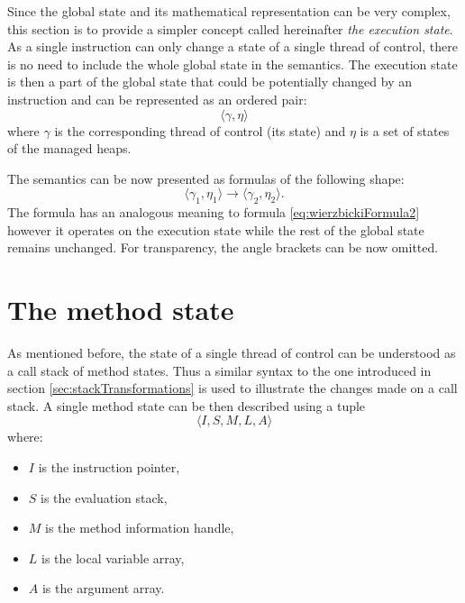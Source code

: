 \documentclass[declaration,shortabstract,english,mgr]{iithesis}
\newcommand{\mstate}[5] {
	\langle#1, #2, #3, #4, #5\rangle
}
\begin{document}
Since the global state and its mathematical representation can be very complex, this section is to provide a simpler concept called hereinafter \textit{the execution state}. As a single instruction can only change a state of a single thread of control, there is no need to include the whole global state in the semantics. The execution state is then a part of the global state that could be potentially changed by an instruction and can be represented as an ordered pair:
\begin{equation}
\label{eq:executionState}
	\langle\gamma, \eta\rangle
\end{equation}
where $\gamma$ is the corresponding thread of control (its state) and $\eta$ is a set of states of the managed heaps.

The semantics can be now presented as formulas of the following shape:
\begin{equation}
\label{eq:simpleSemantics}
	\langle\gamma_1, \eta_1\rangle \rightarrow \langle\gamma_2, \eta_2\rangle.
\end{equation}
The formula has an analogous meaning to formula \ref{eq:wierzbickiFormula2} however it operates on the execution state while the rest of the global state remains unchanged. For transparency, the angle brackets can be now omitted.

\section{The method state}

As mentioned before, the state of a single thread of control can be understood as a call stack of method states. Thus a similar syntax to the one introduced in section \ref{sec:stackTransformations} is used to illustrate the changes made on a call stack. A single method state can be then described using a tuple
\begin{equation}
\label{eq:methodState}
	\mstate{I}{S}{M}{L}{A}
\end{equation}
where:
\begin{itemize}
	\item{$I$ is the instruction pointer},
	\item{$S$ is the evaluation stack},
	\item{$M$ is the method information handle},
	\item{$L$ is the local variable array},
	\item{$A$ is the argument array}.
\end{itemize}
\end{document}
